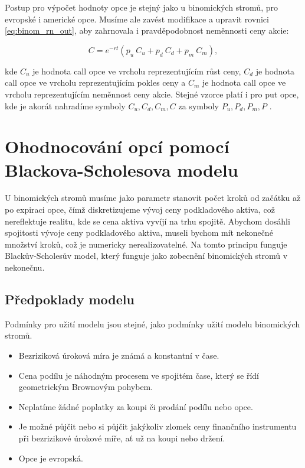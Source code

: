 \documentclass[male,czech,api_bc]{kitheses}
\begin{document}
 Postup pro výpočet hodnoty opce je stejný jako u binomických stromů, pro evropské i americké opce. Musíme ale zavést modifikace a upravit rovnici \eqref{eq:binom_rn_out}, aby zahrnovala i pravděpodobnost neměnnosti ceny akcie:

 \begin{equation}
   C = e^{-rt}(p_u\ C_u + p_d\ C_d + p_m\ C_m),
 \end{equation}

 kde $C_u$ je hodnota call opce ve vrcholu reprezentujícím růst ceny, $C_d$ je hodnota call opce ve vrcholu reprezentujícím pokles ceny a $C_m$ je hodnota call opce ve vrcholu reprezentujícím neměnnost ceny akcie. Stejné vzorce platí i pro put opce, kde je akorát nahradíme symboly $C_u, C_d, C_m, C$ za symboly $P_u, P_d, P_m, P$ \parencites[kaptiola~7.3]{Haug2007}.

  \section{Ohodnocování opcí pomocí Blackova-Scholesova modelu}

  \label{sec:black-scholes_theory}
  U binomických stromů musíme jako parametr stanovit počet kroků od začátku až po expiraci opce, čímž diskretizujeme vývoj ceny podkladového aktiva, což nereflektuje realitu, kde se cena aktiva vyvíjí na trhu spojitě. Abychom dosáhli spojitosti vývoje ceny podkladového aktiva, museli bychom mít nekonečné množství kroků, což je numericky nerealizovatelné. Na tomto principu funguje Blackův-Scholesův model, který funguje jako zobecnění binomických stromů v nekonečnu. \parencites[s.~363]{McDonald2013}

  \subsection{Předpoklady modelu}

  Podmínky pro užití modelu jsou stejné, jako podmínky užití modelu binomických stromů.
  
  \begin{itemize}
    \item Bezriziková úroková míra je známá a konstantní v čase.
    \item Cena podílu je náhodným procesem ve spojitém čase, který se řídí geometrickým Brownovým pohybem.
    \item Neplatíme žádné poplatky za koupi či prodání podílu nebo opce.
    \item Je možné půjčit nebo si půjčit jakýkoliv zlomek ceny finančního instrumentu při bezrizikové úrokové míře, ať už na koupi nebo držení.
    \item Opce je evropská.
  \end{itemize}
\end{document}
